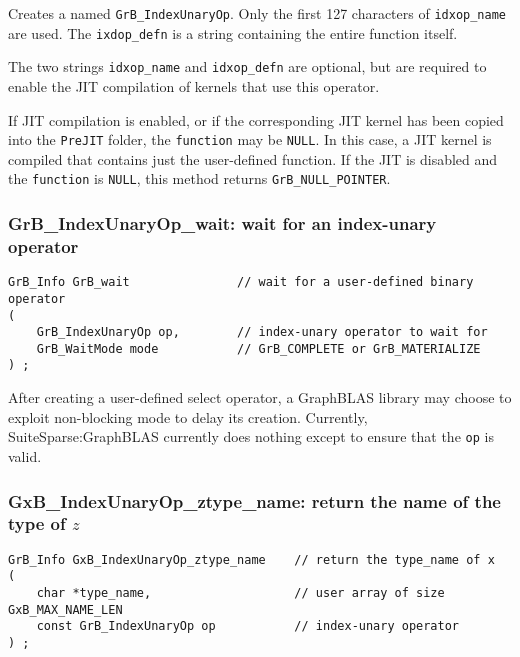 \documentclass[12pt]{article}
\begin{document}
Creates a named \verb'GrB_IndexUnaryOp'.  Only the first 127 characters of
\verb'idxop_name' are used.  The \verb'ixdop_defn' is a string containing the
entire function itself.

The two strings \verb'idxop_name' and \verb'idxop_defn' are optional, but are
required to enable the JIT compilation of kernels that use this operator.

If JIT compilation is enabled, or if the corresponding JIT kernel has been
copied into the \verb'PreJIT' folder, the \verb'function' may be \verb'NULL'.
In this case, a JIT kernel is compiled that contains just the user-defined
function.  If the JIT is disabled and the \verb'function' is \verb'NULL', this
method returns \verb'GrB_NULL_POINTER'.

\subsubsection{{\sf GrB\_IndexUnaryOp\_wait:} wait for an index-unary operator}
\label{idxunop_wait}

\begin{mdframed}[userdefinedwidth=6in]
{\footnotesize
\begin{verbatim}
GrB_Info GrB_wait               // wait for a user-defined binary operator
(
    GrB_IndexUnaryOp op,        // index-unary operator to wait for
    GrB_WaitMode mode           // GrB_COMPLETE or GrB_MATERIALIZE
) ;
\end{verbatim}
}\end{mdframed}

After creating a user-defined select operator, a GraphBLAS library may choose
to exploit non-blocking mode to delay its creation.  Currently,
SuiteSparse:GraphBLAS currently does nothing except to ensure that the
\verb'op' is valid.

\newpage
\subsubsection{{\sf GxB\_IndexUnaryOp\_ztype\_name:} return the name of the type of $z$}
\label{idxunop_ztype_name}

\begin{mdframed}[userdefinedwidth=6in]
{\footnotesize
\begin{verbatim}
GrB_Info GxB_IndexUnaryOp_ztype_name    // return the type_name of x
(
    char *type_name,                    // user array of size GxB_MAX_NAME_LEN
    const GrB_IndexUnaryOp op           // index-unary operator
) ;
\end{verbatim}
}\end{mdframed}
\end{document}
